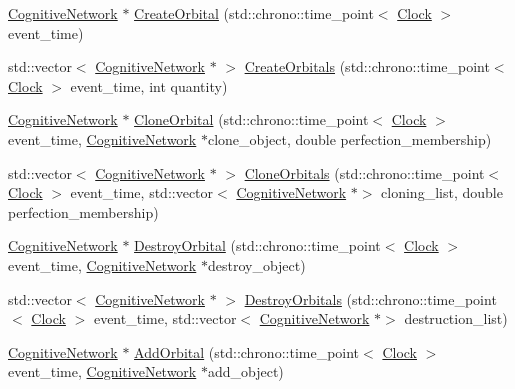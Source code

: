 \begin{DoxyCompactItemize}
\item 
\hyperlink{class_cognitive_network}{Cognitive\+Network} $\ast$ \hyperlink{class_cognitive_network_a5e0a782afc45d75d57fef91dd5513546}{Create\+Orbital} (std\+::chrono\+::time\+\_\+point$<$ \hyperlink{universe_8h_a0ef8d951d1ca5ab3cfaf7ab4c7a6fd80}{Clock} $>$ event\+\_\+time)
\item 
std\+::vector$<$ \hyperlink{class_cognitive_network}{Cognitive\+Network} $\ast$ $>$ \hyperlink{class_cognitive_network_a46d4189cf3e6b9af6190abe7b79539b4}{Create\+Orbitals} (std\+::chrono\+::time\+\_\+point$<$ \hyperlink{universe_8h_a0ef8d951d1ca5ab3cfaf7ab4c7a6fd80}{Clock} $>$ event\+\_\+time, int quantity)
\item 
\hyperlink{class_cognitive_network}{Cognitive\+Network} $\ast$ \hyperlink{class_cognitive_network_aa8992740f25d46b0be3d9d8344c39f67}{Clone\+Orbital} (std\+::chrono\+::time\+\_\+point$<$ \hyperlink{universe_8h_a0ef8d951d1ca5ab3cfaf7ab4c7a6fd80}{Clock} $>$ event\+\_\+time, \hyperlink{class_cognitive_network}{Cognitive\+Network} $\ast$clone\+\_\+object, double perfection\+\_\+membership)
\item 
std\+::vector$<$ \hyperlink{class_cognitive_network}{Cognitive\+Network} $\ast$ $>$ \hyperlink{class_cognitive_network_a266b7baf2fd9d6b5c5652e251830020a}{Clone\+Orbitals} (std\+::chrono\+::time\+\_\+point$<$ \hyperlink{universe_8h_a0ef8d951d1ca5ab3cfaf7ab4c7a6fd80}{Clock} $>$ event\+\_\+time, std\+::vector$<$ \hyperlink{class_cognitive_network}{Cognitive\+Network} $\ast$$>$ cloning\+\_\+list, double perfection\+\_\+membership)
\item 
\hyperlink{class_cognitive_network}{Cognitive\+Network} $\ast$ \hyperlink{class_cognitive_network_aefecb3a2464f7f21449e522af5119c63}{Destroy\+Orbital} (std\+::chrono\+::time\+\_\+point$<$ \hyperlink{universe_8h_a0ef8d951d1ca5ab3cfaf7ab4c7a6fd80}{Clock} $>$ event\+\_\+time, \hyperlink{class_cognitive_network}{Cognitive\+Network} $\ast$destroy\+\_\+object)
\item 
std\+::vector$<$ \hyperlink{class_cognitive_network}{Cognitive\+Network} $\ast$ $>$ \hyperlink{class_cognitive_network_a0ee8259d26e30779bf06471fb8a10bb5}{Destroy\+Orbitals} (std\+::chrono\+::time\+\_\+point$<$ \hyperlink{universe_8h_a0ef8d951d1ca5ab3cfaf7ab4c7a6fd80}{Clock} $>$ event\+\_\+time, std\+::vector$<$ \hyperlink{class_cognitive_network}{Cognitive\+Network} $\ast$$>$ destruction\+\_\+list)
\item 
\hyperlink{class_cognitive_network}{Cognitive\+Network} $\ast$ \hyperlink{class_cognitive_network_ab6caa285c25568259ae935cf9e746af4}{Add\+Orbital} (std\+::chrono\+::time\+\_\+point$<$ \hyperlink{universe_8h_a0ef8d951d1ca5ab3cfaf7ab4c7a6fd80}{Clock} $>$ event\+\_\+time, \hyperlink{class_cognitive_network}{Cognitive\+Network} $\ast$add\+\_\+object)

\end{DoxyCompactItemize}
